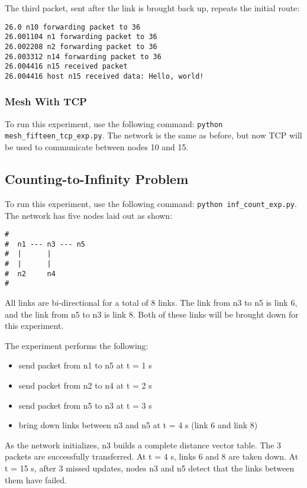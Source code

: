 \documentclass[11pt]{article}
\newcommand{\code}[1]{\texttt{#1}}
\begin{document}
The third packet, sent after the link is brought back up, repeats the initial route:
\begin{lstlisting}
26.0 n10 forwarding packet to 36
26.001104 n1 forwarding packet to 36
26.002208 n2 forwarding packet to 36
26.003312 n14 forwarding packet to 36
26.004416 n15 received packet
26.004416 host n15 received data: Hello, world!
\end{lstlisting}

\subsubsection{Mesh With TCP}
To run this experiment, use the following command: \code{python mesh\_fifteen\_tcp\_exp.py}. The network is the same as before, but now TCP will be used to communicate between nodes 10 and 15.

\subsection{Counting-to-Infinity Problem}
To run this experiment, use the following command: \code{python inf\_count\_exp.py}. The network has five nodes laid out as shown:

\begin{lstlisting}
#
#  n1 --- n3 --- n5
#  |      |
#  |      |
#  n2     n4
#
\end{lstlisting}

All links are bi-directional for a total of 8 links. The link from n3 to n5 is link 6, and the link from n5 to n3 is link 8. Both of these links will be brought down for this experiment.

The experiment performs the following:
\begin{itemize}
	\item send packet from n1 to n5 at t = 1 s
	\item send packet from n2 to n4 at t = 2 s
	\item send packet from n5 to n3 at t = 3 s
	\item bring down links between n3 and n5 at t = 4 s (link 6 and link 8)
\end{itemize}

As the network initializes, n3 builds a complete distance vector table. The 3 packets are successfully transferred. At t = 4 s, links 6 and 8 are taken down. At t = 15 s, after 3 missed updates, nodes n3 and n5 detect that the links between them have failed.
\end{document}
